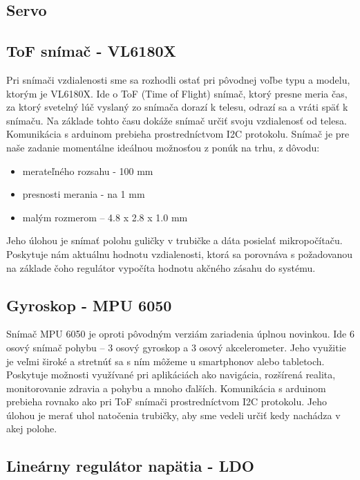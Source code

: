 \subsection{Servo}
\label{kap:2.2.1}

\subsection{ToF snímač - VL6180X}
\label{kap:2.2.2}

Pri snímači vzdialenosti sme sa rozhodli ostať pri pôvodnej voľbe typu a modelu, ktorým je VL6180X. Ide o ToF (Time of Flight) snímač, ktorý presne meria čas, za ktorý svetelný lúč vyslaný zo snímača dorazí k telesu, odrazí sa a vráti späť k snímaču. Na základe tohto času dokáže snímač určiť svoju vzdialenosť od telesa. Komunikácia s arduinom prebieha prostredníctvom I2C protokolu. Snímač je pre naše zadanie momentálne ideálnou možnosťou z ponúk na trhu, z dôvodu:
\begin{itemize}
	\item merateľného rozsahu - 100 mm
	\item presnosti merania - na 1 mm 
	\item malým rozmerom – 4.8 x 2.8 x 1.0 mm
\end{itemize}
Jeho úlohou je snímať polohu guličky v trubičke a dáta posielať mikropočítaču. Poskytuje nám aktuálnu hodnotu vzdialenosti, ktorá sa porovnáva s požadovanou na základe čoho regulátor vypočíta hodnotu akčného zásahu do systému.

\subsection{Gyroskop - MPU 6050}
\label{kap:2.2.3}

Snímač MPU 6050 je oproti pôvodným verziám zariadenia úplnou novinkou. Ide 6 osový snímač pohybu – 3 osový gyroskop a 3 osový akcelerometer. Jeho využitie je veľmi široké a stretnúť sa s ním môžeme u smartphonov alebo tabletoch. Poskytuje možnosti využívané pri aplikáciách ako navigácia, rozšírená realita, monitorovanie zdravia a pohybu a mnoho ďalších. Komunikácia s arduinom prebieha rovnako ako pri ToF snímači prostredníctvom I2C protokolu. 
Jeho úlohou je merať uhol natočenia trubičky, aby sme vedeli určiť kedy nachádza v akej polohe. 


\subsection{Lineárny regulátor napätia - LDO}
\label{kap:2.2.4}

